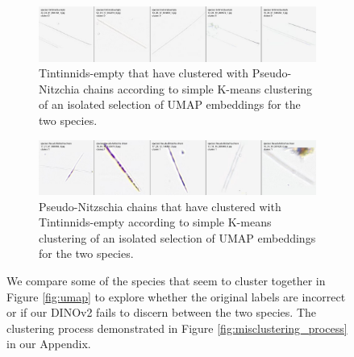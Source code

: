\begin{figure}[H]
    \centering
    \begin{subfigure}[b]{1\linewidth}
        \includegraphics[width=\linewidth]{examples/tests_eb/figs/misclustered_empty.png}
        \caption{Tintinnids-empty that have clustered with Pseudo-Nitzchia chains according to simple K-means clustering of an isolated selection of UMAP embeddings for the two species.}
    \end{subfigure}
    
    \vspace{1em}
    
    \begin{subfigure}[b]{1\linewidth}
        \includegraphics[width=\linewidth]{examples/tests_eb/figs/misclustered_pseudo-nitz.png}
        \caption{Pseudo-Nitzschia chains that have clustered with Tintinnids-empty according to simple K-means clustering of an isolated selection of UMAP embeddings for the two species.}
    \end{subfigure}
    \caption{We compare some of the species that seem to cluster together in Figure \ref{fig:umap} to explore whether the original labels are incorrect or if our DINOv2 fails to discern between the two species. The clustering process demonstrated in Figure \ref{fig:misclustering_process} in our Appendix.}
    \label{fig:misclusters}
\end{figure}


